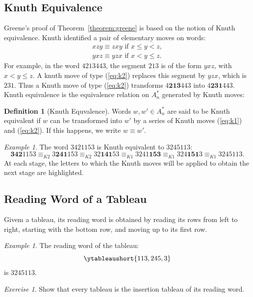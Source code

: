 \documentclass[10pt]{amsproc}
\theoremstyle{definition}
\newtheorem{definition}[theorem]{Definition}
\theoremstyle{remark}
\newtheorem{example}[theorem]{Example}
\newtheorem{exercise}[theorem]{Exercise}
\begin{document}
\subsection{Knuth Equivalence}
\label{sec:knuth-equivalence}

Greene's proof of Theorem~\ref{theorem:greene} is based on the notion of Knuth equivalence.
Knuth \cite{knuth} identified a pair of elementary moves on words:
\begin{gather}
  \tag{$K1$}\label{eq:k1}
  xzy \equiv zxy \text{ if } x\leq y < z,
  \\
  \tag{$K2$}\label{eq:k2}
  yxz \equiv yzx \text{ if } x < y \leq z.
\end{gather}
For example, in the word $4213443$, the segment $213$ is of the form $yxz$, with $x<y\leq z$.
A knuth move of type (\ref{eq:k2}) replaces this segment by $yzx$, which is $231$.
Thus a Knuth move of type (\ref{eq:k2}) transforms $4\textbf{213}443$ into $4\textbf{231}443$.
Knuth equivalence is the equivalence relation on $A_n^*$ generated by Knuth moves:
\begin{definition}[Knuth Equvalence]
  \label{definition:Knuth-equiv}
  Words $w,w'\in A_n^*$ are said to be Knuth equivalent if $w$ can be transformed into $w'$ by a series of Knuth moves (\ref{eq:k1}) and (\ref{eq:k2}).
  If this happens, we write $w\equiv w'$.
\end{definition}
\begin{example}
  \label{example:knuth-red}
  The word $3421153$ is Knuth equivalent to $3245113$:
  \begin{displaymath}
    \textbf{342}1153 \equiv_{K2} 3\textbf{241}153 \equiv_{K2} 32\textbf{141}53 \equiv_{K1} 3241\textbf{153} \equiv_{K1} 324\textbf{151}3 \equiv_{K1} 3245113.
  \end{displaymath}
  At each stage, the letters to which the Knuth moves will be applied to obtain the next stage are highlighted.
\end{example}
\subsection{Reading Word of a Tableau}
\label{sec:reading-word}
Givem a tableau, its reading word is obtained by reading its rows from left to right, starting with the bottom row, and moving up to its first row.
\begin{example}
  \label{example:reading-word}
  The reading word of the tableau:
  \begin{displaymath}
    \ytableaushort{113,245,3}
  \end{displaymath}
  is $3245113$.
\end{example}
\begin{exercise}
  Show that every tableau is the insertion tableau of its reading word.
\end{exercise}
\end{document}
